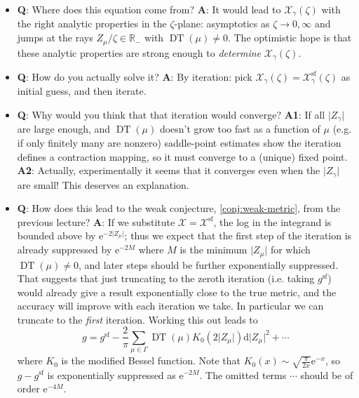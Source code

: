 \documentclass[12pt,letterpaper,reqno]{article}
\numberwithin{equation}{section}
\begin{document}
\begin{itemize}
  \item {\bf Q}: Where does this equation come from? {\bf A}: It would lead to $\mathcal X_\gamma(\zeta)$ with
  the right analytic properties in the $\zeta$-plane: asymptotics as $\zeta \to 0,\infty$
  and jumps at the rays $Z_\mu / \zeta \in \mathbb R_-$ with $\operatorname{DT}(\mu) \neq 0$.
  The optimistic hope is that these analytic properties are strong enough
  to \textit{determine} $\mathcal X_\gamma(\zeta)$.

  \item {\bf Q}: How do you actually solve it? {\bf A}: By iteration: pick
  $\mathcal X_\gamma(\zeta) = \mathcal X_\gamma^{\mathrm{sf}}(\zeta)$ as initial guess, 
  and then iterate.

  \item {\bf Q}: Why would you think that that iteration would converge?
  {\bf A1}: If all $\lvert Z_\gamma \rvert$ are large enough, and $\operatorname{DT}(\mu)$ doesn't grow too fast
  as a function of $\mu$ (e.g. if only finitely many are nonzero)
  saddle-point estimates show 
  the iteration defines a contraction mapping, so it must
  converge to a (unique) fixed point.
  {\bf A2}: Actually, experimentally it seems that
  it converges even when the $\lvert Z_\gamma \rvert$ are small! This
  deserves an explanation.

  \item {\bf Q}: How does this lead to the weak
  conjecture, \autoref{conj:weak-metric}, from the previous lecture? {\bf A}: 
  If we substitute $\mathcal X = \mathcal X^{\mathrm{sf}}$, the log in the
  integrand is bounded above by $\mathrm e^{-2 \lvert Z_\mu \rvert}$;
  thus we expect that the first step of the iteration is already
  suppressed by $\mathrm e^{-2 M}$ where $M$ is the minimum $\lvert Z_\mu \rvert$
  for which $\operatorname{DT}(\mu) \neq 0$, and later steps
  should be further exponentially suppressed. That suggests
  that just truncating to the zeroth iteration (i.e. taking $g^{\mathrm{sf}}$)
  would already give a result exponentially close to the true metric,
  and the accuracy will improve with each iteration we take.
  In particular we can truncate to the \textit{first} iteration.
  Working this out leads to
  \begin{equation}
    g = g^{\mathrm{sf}} - \frac{2}{\pi} \sum_{\mu \in \Gamma} \operatorname{DT}(\mu) K_0\left( 2 \lvert Z_\mu \rvert \right) \mathrm{d} \lvert Z_\mu \rvert^2 + \cdots
  \end{equation}
  where $K_0$ is the modified Bessel function.
  Note that $K_0(x) \sim \sqrt{\frac{\pi}{2x}} \mathrm e^{-x}$,
  so $g - g^{\mathrm{sf}}$ is exponentially suppressed as $\mathrm e^{-2M}$.
  The omitted terms $\cdots$ should be of order $\mathrm e^{-4M}$.


\end{itemize}
\end{document}
